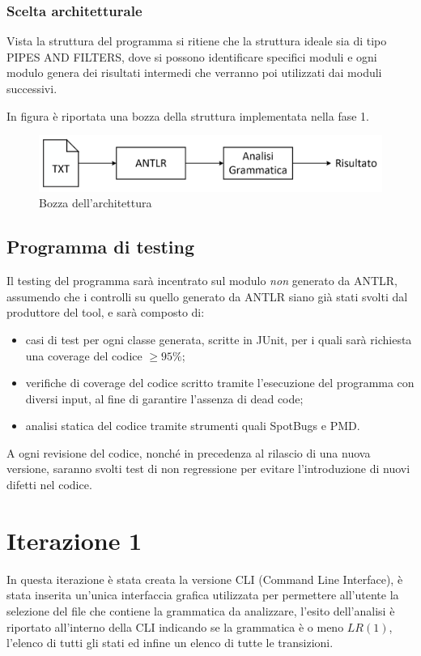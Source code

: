 \documentclass[12pt]{article}
\begin{document}
\subsubsection{Scelta architetturale}\label{bozzaArc}
Vista la struttura del programma si ritiene che la struttura ideale sia di tipo PIPES AND FILTERS, dove si possono identificare specifici moduli e ogni modulo genera dei risultati intermedi che verranno poi utilizzati dai moduli successivi.\par
In figura è riportata una bozza della struttura implementata nella fase 1.
\par

\begin{figure}[h]
\centering
\includegraphics[scale=0.8]{immagini/bozzaArchitettura_v0.png}
\caption{Bozza dell'architettura}
\end{figure}

\pagebreak

\subsection{Programma di testing}
Il testing del programma sarà incentrato sul modulo \textit{non} generato da ANTLR, assumendo che i controlli su quello generato da ANTLR siano già stati svolti dal produttore del tool, e sarà composto di:
\begin{itemize}
\item casi di test per ogni classe generata, scritte in JUnit, per i quali sarà richiesta una coverage del codice $\geq 95\%$;
\item verifiche di coverage del codice scritto tramite l'esecuzione del programma con diversi input, al fine di garantire l'assenza di dead code;
\item analisi statica del codice tramite strumenti quali SpotBugs e PMD.
\end{itemize}
A ogni revisione del codice, nonché in precedenza al rilascio di una nuova versione, saranno svolti test di non regressione per evitare l'introduzione di nuovi difetti nel codice.
\pagebreak

\section{Iterazione 1}
In questa iterazione è stata creata la versione CLI (Command Line Interface), è stata inserita un'unica interfaccia grafica utilizzata per permettere all'utente la selezione del file che contiene la grammatica da analizzare, l'esito dell'analisi è riportato all'interno della CLI indicando se la grammatica è o meno $LR \left( 1 \right)$, l'elenco di tutti gli stati ed infine un elenco di tutte le transizioni.
\end{document}
